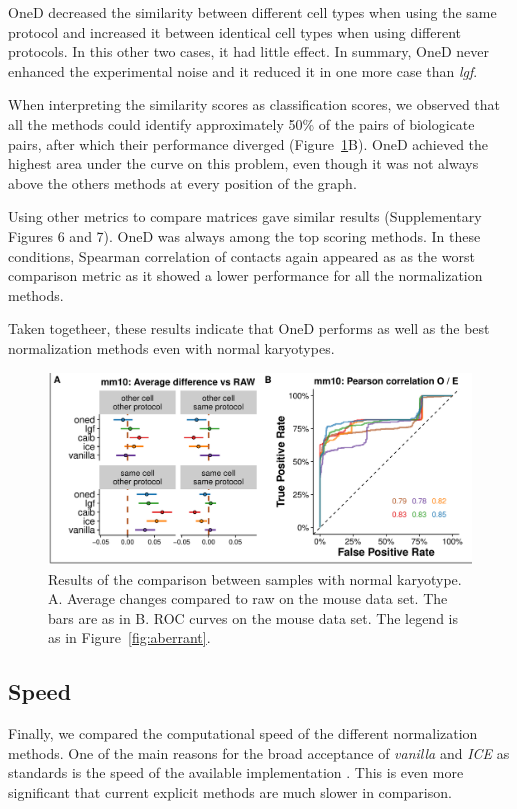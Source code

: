 \documentclass{bioinfo}
\begin{document}
OneD decreased the similarity between different cell types when using the
same protocol and increased it between identical cell types when using
different protocols. In this other two cases, it had little effect. In
summary, OneD never enhanced the experimental noise and it reduced it in
one more case than \textit{lgf}.

When interpreting the similarity scores as classification scores, we
observed that all the methods could identify approximately 50\% of the
pairs of biologicate pairs, after which their performance diverged
(Figure~\ref{fig:normal}B). OneD achieved the highest area under the curve
on this problem, even though it was not always above the others methods at
every position of the graph.

Using other metrics to compare matrices gave similar results
(Supplementary Figures 6 and 7). OneD was always among the top scoring
methods. In these conditions, Spearman correlation of contacts again
appeared as as the worst comparison metric as it showed a lower
performance for all the normalization methods.

Taken togetheer, these results indicate that OneD performs as well as the
best normalization methods even with normal karyotypes.

\begin{figure}
\centerline{\includegraphics[width=.50\textwidth]{img/correlation_normal_figure4.pdf}}
\caption{
Results of the comparison between samples with normal karyotype.  A.
Average changes compared to raw on the mouse data set. The bars are as in
B. ROC curves on the mouse data set. The legend is as in
Figure~\ref{fig:aberrant}.}
\label{fig:normal}
\end{figure}



\subsection{Speed}

Finally, we compared the computational speed of the different
normalization methods. One of the main reasons for the broad acceptance of
\textit{vanilla} and \textit{ICE} as standards is the speed of the
available implementation \citep{imakaev2012iterative}. This is even 
more significant that current explicit methods \citep{servant2012hitc} are
much slower in comparison.
\end{document}
